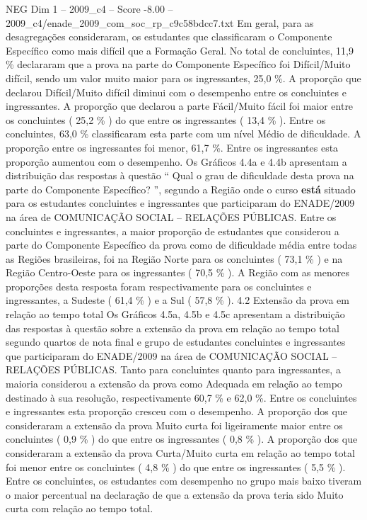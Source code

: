 \begin{textsample}{NEG Dim 1 – 2009\_c4 – Score -8.00 – 2009\_c4/enade\_2009\_com\_soc\_rp\_c9c58bdcc7.txt}
Em geral, para as desagregações consideraram, os estudantes que classificaram o Componente Específico como mais difícil que a Formação Geral.
No total de concluintes, 11,9 \% declararam que a prova na parte do Componente Específico foi Difícil/Muito difícil, sendo um valor muito maior para os ingressantes, 25,0 \%.
A proporção que declarou Difícil/Muito difícil diminui com o desempenho entre os concluintes e ingressantes.
A proporção que declarou a parte Fácil/Muito fácil foi maior entre os concluintes ( 25,2 \% ) do que entre os ingressantes ( 13,4 \% ).
Entre os concluintes, 63,0 \% classificaram esta parte com um nível Médio de dificuldade.
A proporção entre os ingressantes foi menor, 61,7 \%.
Entre os ingressantes esta proporção aumentou com o desempenho.
Os Gráficos 4.4a e 4.4b apresentam a distribuição das respostas à questão “ Qual o grau de dificuldade desta prova na parte do Componente Específico? ”, segundo a Região onde o curso \textbf{está} situado para os estudantes concluintes e ingressantes que participaram do ENADE/2009 na área de COMUNICAÇÃO SOCIAL – RELAÇÕES PÚBLICAS.
Entre os concluintes e ingressantes, a maior proporção de estudantes que considerou a parte do Componente Específico da prova como de dificuldade média entre todas as Regiões brasileiras, foi na Região Norte para os concluintes ( 73,1 \% ) e na Região Centro-Oeste para os ingressantes ( 70,5 \% ).
A Região com as menores proporções desta resposta foram respectivamente para os concluintes e ingressantes, a Sudeste ( 61,4 \% ) e a Sul ( 57,8 \% ). 4.2 Extensão da prova em relação ao tempo total Os Gráficos 4.5a, 4.5b e 4.5c apresentam a distribuição das respostas à questão sobre a extensão da prova em relação ao tempo total segundo quartos de nota final e grupo de estudantes concluintes e ingressantes que participaram do ENADE/2009 na área de COMUNICAÇÃO SOCIAL – RELAÇÕES PÚBLICAS.
Tanto para concluintes quanto para ingressantes, a maioria considerou a extensão da prova como Adequada em relação ao tempo destinado à sua resolução, respectivamente 60,7 \% e 62,0 \%.
Entre os concluintes e ingressantes esta proporção cresceu com o desempenho.
A proporção dos que consideraram a extensão da prova Muito curta foi ligeiramente maior entre os concluintes ( 0,9 \% ) do que entre os ingressantes ( 0,8 \% ).
A proporção dos que consideraram a extensão da prova Curta/Muito curta em relação ao tempo total foi menor entre os concluintes ( 4,8 \% ) do que entre os ingressantes ( 5,5 \% ).
Entre os concluintes, os estudantes com desempenho no grupo mais baixo tiveram o maior percentual na declaração de que a extensão da prova teria sido Muito curta com relação ao tempo total.

\end{textsample}
